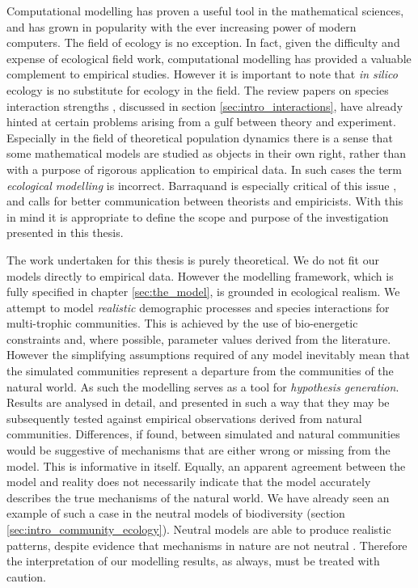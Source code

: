 Computational modelling has proven a useful tool in the mathematical sciences, and has grown in popularity with the ever increasing power of modern computers. The field of ecology is no exception. In fact, given the difficulty and expense of ecological field work, computational modelling has provided a valuable complement to empirical studies. However it is important to note that \emph{in silico} ecology is no substitute for ecology in the field. The review papers on species interaction strengths \cite{berlow2004interaction,wootton2005measurement}, discussed in section \ref{sec:intro_interactions}, have already hinted at certain problems arising from a gulf between theory and experiment. Especially in the field of theoretical population dynamics there is a sense that some mathematical models are studied as objects in their own right, rather than with a purpose of rigorous application to empirical data. In such cases the term \emph{ecological modelling} is incorrect. Barraquand is especially critical of this issue \cite{barraquand2014functional}, and calls for better communication between theorists and empiricists. With this in mind it is appropriate to define the scope and purpose of the investigation presented in this thesis. 

The work undertaken for this thesis is purely theoretical. We do not fit our models directly to empirical data. However the modelling framework, which is fully specified in chapter \ref{sec:the_model}, is grounded in ecological realism. We attempt to model \emph{realistic} demographic processes and species interactions for multi-trophic communities. This is achieved by the use of bio-energetic constraints and, where possible, parameter values derived from the literature. However the simplifying assumptions required of any model inevitably mean that the simulated communities represent a departure from the communities of the natural world. As such the modelling serves as a tool for \emph{hypothesis generation}. Results are analysed in detail, and presented in such a way that they may be subsequently tested against empirical observations derived from natural communities. Differences, if found, between simulated and natural communities would be suggestive of mechanisms that are either wrong or missing from the model. This is informative in itself. Equally, an apparent agreement between the model and reality does not necessarily indicate that the model accurately describes the true mechanisms of the natural world. We have already seen an example of such a case in the neutral models of biodiversity (section \ref{sec:intro_community_ecology}). Neutral models are able to produce realistic patterns, despite evidence that mechanisms in nature are not neutral \cite{purves2005ecological}. Therefore the interpretation of our modelling results, as always, must be treated with caution.


